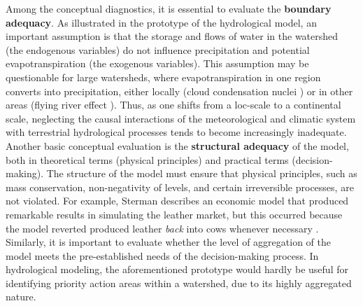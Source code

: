 \documentclass[./main_en.tex]{subfiles}
\begin{document}
\par Among the conceptual diagnostics, it is essential to evaluate the \textbf{boundary adequacy}. As illustrated in the prototype of the hydrological \gls{model}, an important assumption is that the storage and flows of water in the watershed (the endogenous variables) do not influence precipitation and potential evapotranspiration (the exogenous variables). This assumption may be questionable for large watersheds, where evapotranspiration in one region converts into precipitation, either locally (cloud condensation nuclei \cite{Poschl2010, Kerminen2012}) or in other areas (flying river effect \cite{Arraut2012, Pearce2019}). Thus, as one shifts from a \gls{loc-scale} to a continental scale, neglecting the causal interactions of the meteorological and climatic \gls{system} with terrestrial hydrological processes tends to become increasingly inadequate. Another basic conceptual evaluation is the \textbf{structural adequacy} of the \gls{model}, both in theoretical terms (physical principles) and practical terms (decision-making). The structure of the \gls{model} must ensure that physical principles, such as mass conservation, non-negativity of levels, and certain irreversible processes, are not violated. For example, Sterman describes an economic \gls{model} that produced remarkable results in simulating the leather market, but this occurred because the \gls{model} reverted produced leather \textit{back} into cows whenever necessary \cite{sterman2000}. Similarly, it is important to evaluate whether the level of aggregation of the \gls{model} meets the pre-established needs of the decision-making process. In hydrological modeling, the aforementioned prototype would hardly be useful for identifying priority action areas within a watershed, due to its highly aggregated nature.
 
\end{document}
